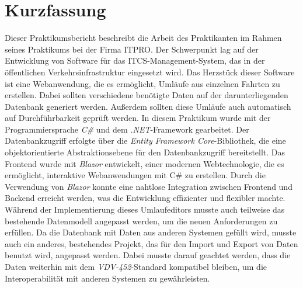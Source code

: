 \chapter{Kurzfassung}%
Dieser Praktikumsbericht beschreibt die Arbeit des Praktikanten im Rahmen seines Praktikums bei der Firma ITPRO. Der Schwerpunkt lag auf der Entwicklung
von Software für das ITCS-Management-System, das in der öffentlichen Verkehrsinfrastruktur eingesetzt wird. Das Herzstück dieser Software ist eine Webanwendung,
die es ermöglicht, Umläufe aus einzelnen Fahrten zu erstellen. Dabei sollten verschiedene benötigte Daten auf der darunterliegenden Datenbank generiert werden.
Außerdem sollten diese Umläufe auch automatisch auf Durchführbarkeit geprüft werden.
In diesem Praktikum wurde mit der Programmiersprache \emph{C\#} und dem \emph{.NET}-Framework gearbeitet. Der Datenbankzugriff erfolgte über die
\emph{Entity Framework Core}-Bibliothek, 
die eine objektorientierte Abstraktionsebene für den Datenbankzugriff bereitstellt. Das Frontend wurde mit \emph{Blazor} entwickelt, einer modernen Webtechnologie, 
die es ermöglicht, interaktive Webanwendungen mit C\# zu erstellen. Durch die Verwendung von \emph{Blazor} konnte eine nahtlose Integration zwischen Frontend und Backend erreicht werden,
was die Entwicklung effizienter und flexibler machte.
Während der Implementierung dieses Umlaufeditors musste auch teilweise das bestehende Datenmodell angepasst werden, um die neuen Anforderungen zu erfüllen. 
Da die Datenbank mit Daten aus anderen Systemen gefüllt wird, musste auch ein anderes, bestehendes Projekt, das für den Import und Export von Daten benutzt wird, angepasst werden.
Dabei musste darauf geachtet werden, dass die Daten weiterhin mit dem \emph{VDV-452}-Standard kompatibel bleiben, um die Interoperabilität mit anderen Systemen zu gewährleisten.

